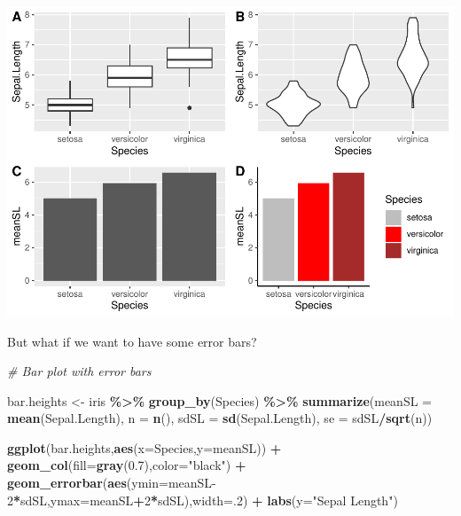 \documentclass[
]{article}
\newenvironment{Shaded}{\begin{snugshade}}{\end{snugshade}}
\newcommand{\AttributeTok}[1]{\textcolor[rgb]{0.13,0.29,0.53}{#1}}
\newcommand{\CommentTok}[1]{\textcolor[rgb]{0.56,0.35,0.01}{\textit{#1}}}
\newcommand{\DecValTok}[1]{\textcolor[rgb]{0.00,0.00,0.81}{#1}}
\newcommand{\FloatTok}[1]{\textcolor[rgb]{0.00,0.00,0.81}{#1}}
\newcommand{\FunctionTok}[1]{\textcolor[rgb]{0.13,0.29,0.53}{\textbf{#1}}}
\newcommand{\NormalTok}[1]{#1}
\newcommand{\OtherTok}[1]{\textcolor[rgb]{0.56,0.35,0.01}{#1}}
\newcommand{\SpecialCharTok}[1]{\textcolor[rgb]{0.81,0.36,0.00}{\textbf{#1}}}
\newcommand{\StringTok}[1]{\textcolor[rgb]{0.31,0.60,0.02}{#1}}
\begin{document}
\includegraphics{module1_3_files/figure-latex/unnamed-chunk-14-1.pdf}

But what if we want to have some error bars?

\begin{Shaded}
\begin{Highlighting}[]
\CommentTok{\# Bar plot with error bars}

\NormalTok{bar.heights }\OtherTok{\textless{}{-}}\NormalTok{ iris }\SpecialCharTok{\%\textgreater{}\%} 
  \FunctionTok{group\_by}\NormalTok{(Species) }\SpecialCharTok{\%\textgreater{}\%} 
  \FunctionTok{summarize}\NormalTok{(}\AttributeTok{meanSL =} \FunctionTok{mean}\NormalTok{(Sepal.Length),}
            \AttributeTok{n =} \FunctionTok{n}\NormalTok{(),}
            \AttributeTok{sdSL =} \FunctionTok{sd}\NormalTok{(Sepal.Length),}
            \AttributeTok{se =}\NormalTok{ sdSL}\SpecialCharTok{/}\FunctionTok{sqrt}\NormalTok{(n))}
  
\FunctionTok{ggplot}\NormalTok{(bar.heights,}\FunctionTok{aes}\NormalTok{(}\AttributeTok{x=}\NormalTok{Species,}\AttributeTok{y=}\NormalTok{meanSL)) }\SpecialCharTok{+} 
  \FunctionTok{geom\_col}\NormalTok{(}\AttributeTok{fill=}\FunctionTok{gray}\NormalTok{(}\FloatTok{0.7}\NormalTok{),}\AttributeTok{color=}\StringTok{"black"}\NormalTok{) }\SpecialCharTok{+}
  \FunctionTok{geom\_errorbar}\NormalTok{(}\FunctionTok{aes}\NormalTok{(}\AttributeTok{ymin=}\NormalTok{meanSL}\DecValTok{{-}2}\SpecialCharTok{*}\NormalTok{sdSL,}\AttributeTok{ymax=}\NormalTok{meanSL}\SpecialCharTok{+}\DecValTok{2}\SpecialCharTok{*}\NormalTok{sdSL),}\AttributeTok{width=}\NormalTok{.}\DecValTok{2}\NormalTok{) }\SpecialCharTok{+}
  \FunctionTok{labs}\NormalTok{(}\AttributeTok{y=}\StringTok{"Sepal Length"}\NormalTok{)}
\end{Highlighting}
\end{Shaded}
\end{document}
